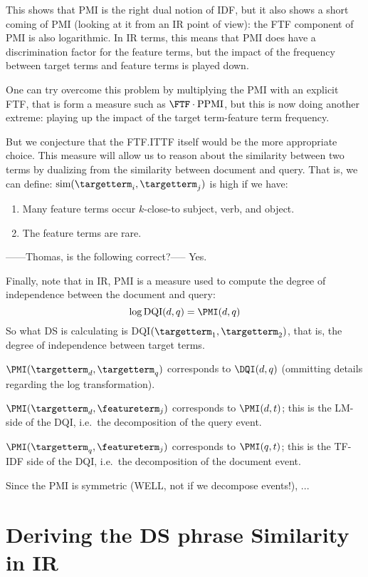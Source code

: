 This  shows  that PMI is  the right dual notion of IDF, but  it also shows a short coming of PMI   (looking at it from an IR point of view): the FTF component of PMI is also  logarithmic. In IR terms, this means that PMI does have a  discrimination factor for the feature terms, but the impact of the  frequency between target terms and feature terms is played down. 

One can try overcome this problem by  multiplying the PMI with an explicit FTF, that is form a measure such as $\FTF \cdot \textmd{PPMI}$, but this is now doing another extreme: playing up the impact of the target term-feature term frequency.  

But we conjecture that  the FTF.ITTF itself would be the more appropriate choice.   This measure will allow us to reason about the similarity between two terms by dualizing from  the similarity between document and query. That is, we can define:  $\textmd{sim}(\targetterm_i,\targetterm_j)$ is high if we have:
\begin{enumerate}
\item Many feature terms occur $k$-close-to  subject, verb, and object.
\item The feature terms are rare.
\end{enumerate}

------Thomas, is the following correct?-----
Yes.

Finally, note that in IR, PMI is a measure used to compute the degree of independence between the document and query:
\[
\log\textmd{DQI}(d,q) = \PMI(d,q)
\] 
So what DS is calculating is DQI$(\targetterm_1, \targetterm_2)$, that is,  the degree of independence between target terms.



$\PMI(\targetterm_d,\targetterm_q)$ corresponds to $\DQI(d,q)$ (ommitting details regarding the log transformation).

$\PMI(\targetterm_d,\featureterm_j)$ corresponds to
$\PMI(d,t)$; this is the LM-side of the DQI, i.e.~the decomposition of the query event.

$\PMI(\targetterm_q,\featureterm_j)$ corresponds to
$\PMI(q,t)$; this is the TF-IDF side
of the DQI, i.e.~the decomposition of the document event.

Since the PMI is symmetric (WELL, not if we decompose events!), ...




\section{Deriving the DS phrase Similarity in IR}
\label{sec:DS-Phrase-Similarity-vs-XF-IDF}


